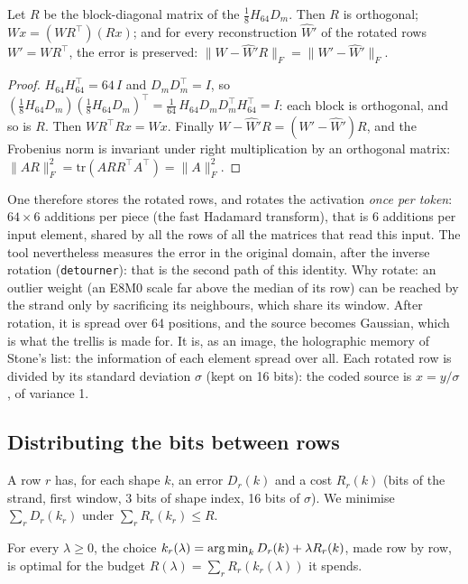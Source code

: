 \begin{proposition}\label{t3gen:prop:rotation}
Let $R$ be the block-diagonal matrix of the $\frac18 H_{64} D_m$. Then $R$ is orthogonal; $Wx = (WR^\top)(Rx)$; and for every reconstruction $\hat W' $ of the rotated rows $W' = WR^\top$, the error is preserved: $\|W - \hat W' R\|_F = \|W' - \hat W'\|_F$.
\end{proposition}

\begin{proof}
$H_{64} H_{64}^\top = 64\, I$ and $D_m D_m^\top = I$, so $(\frac18 H_{64} D_m)(\frac18 H_{64} D_m)^\top = \frac{1}{64}\, H_{64} D_m D_m^\top H_{64}^\top = I$: each block is orthogonal, and so is $R$. Then $W R^\top R x = W x$. Finally $W - \hat W' R = (W' - \hat W') R$, and the Frobenius norm is invariant under right multiplication by an orthogonal matrix: $\|AR\|_F^2 = \mathrm{tr}(A R R^\top A^\top) = \|A\|_F^2$.
\end{proof}

One therefore stores the rotated rows, and rotates the activation \emph{once per token}: $64 \times 6$ additions per piece (the fast Hadamard transform), that is 6 additions per input element, shared by all the rows of all the matrices that read this input. The tool nevertheless measures the error in the original domain, after the inverse rotation (\texttt{detourner}): that is the second path of this identity. Why rotate: an outlier weight (an E8M0 scale far above the median of its row) can be reached by the strand only by sacrificing its neighbours, which share its window. After rotation, it is spread over 64 positions, and the source becomes Gaussian, which is what the trellis is made for. It is, as an image, the holographic memory of Stone's list: the information of each element spread over all. Each rotated row is divided by its standard deviation $\sigma$ (kept on 16 bits): the coded source is $x = y/\sigma$, of variance 1.

\subsection{Distributing the bits between rows}

A row $r$ has, for each shape $k$, an error $D_r(k)$ and a cost $R_r(k)$ (bits of the strand, first window, 3 bits of shape index, 16 bits of $\sigma$). We minimise $\sum_r D_r(k_r)$ under $\sum_r R_r(k_r) \le R$.

\begin{proposition}\label{t3gen:prop:everett}
For every $\lambda \ge 0$, the choice $k_r(\lambda) = \operatorname*{arg\,min}_k D_r(k) + \lambda R_r(k)$, made row by row, is optimal for the budget $R(\lambda) = \sum_r R_r(k_r(\lambda))$ it spends.
\end{proposition}

